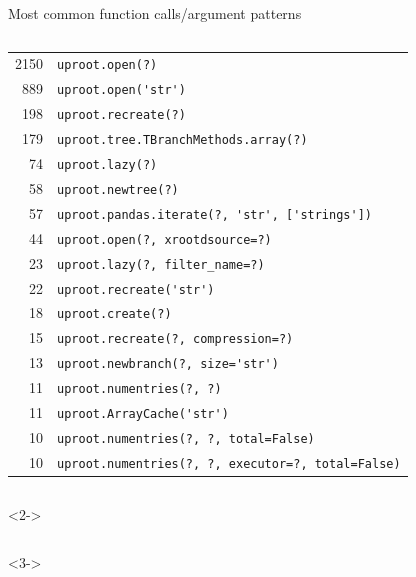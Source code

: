 \documentclass[aspectratio=169]{beamer}
\begin{document}
\begin{frame}[fragile]{Most common function calls/argument patterns}
\begin{columns}
\vspace{0.05 cm}
\begin{tabular}{r l}
2150 & \verb|uproot.open(?)| \\
 889 & \verb|uproot.open('str')| \\
 198 & \verb|uproot.recreate(?)| \\
 179 & \verb|uproot.tree.TBranchMethods.array(?)| \\
  74 & \verb|uproot.lazy(?)| \\
  58 & \verb|uproot.newtree(?)| \\
  57 & \verb|uproot.pandas.iterate(?, 'str', ['strings'])| \\
  44 & \verb|uproot.open(?, xrootdsource=?)| \\
  23 & \verb|uproot.lazy(?, filter_name=?)| \\
  22 & \verb|uproot.recreate('str')| \\
  18 & \verb|uproot.create(?)| \\
  15 & \verb|uproot.recreate(?, compression=?)| \\
  13 & \verb|uproot.newbranch(?, size='str')| \\
  11 & \verb|uproot.numentries(?, ?)| \\
  11 & \verb|uproot.ArrayCache('str')| \\
  10 & \verb|uproot.numentries(?, ?, total=False)| \\
  10 & \verb|uproot.numentries(?, ?, executor=?, total=False)| \\
\end{tabular}
\end{columns}

\vspace{-5 cm}
\begin{uncoverenv}<2->
\begin{columns}
\hspace{8.3 cm}
\end{columns}
\end{uncoverenv}
\vspace{5 cm}

\vspace{-10.05 cm}
\begin{uncoverenv}<3->
\begin{columns}
\hspace{7.1 cm}
\end{columns}
\end{uncoverenv}
\end{frame}
\end{document}
